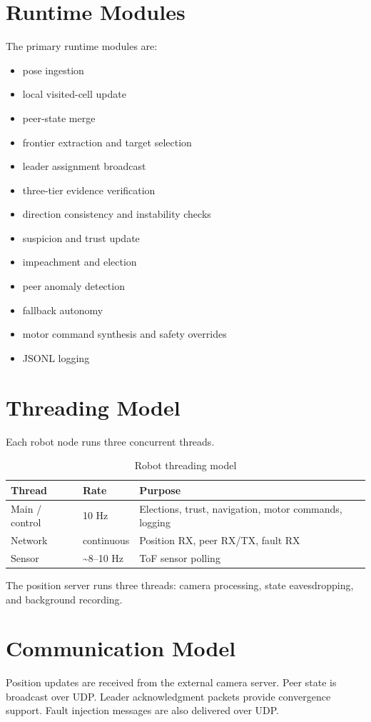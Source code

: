 \documentclass[a4paper,oneside,titlepage,11pt]{report}
\begin{document}
\section{Runtime Modules}
The primary runtime modules are:
\begin{itemize}
    \item pose ingestion
    \item local visited-cell update
    \item peer-state merge
    \item frontier extraction and target selection
    \item leader assignment broadcast
    \item three-tier evidence verification
    \item direction consistency and instability checks
    \item suspicion and trust update
    \item impeachment and election
    \item peer anomaly detection
    \item fallback autonomy
    \item motor command synthesis and safety overrides
    \item JSONL logging
\end{itemize}

\section{Threading Model}
Each robot node runs three concurrent threads.

\begin{table}[H]
\centering
\caption{Robot threading model}
\label{tab:robot_threads}
\begin{tabular}{lll}
\toprule
\textbf{Thread} & \textbf{Rate} & \textbf{Purpose} \\
\midrule
Main / control & 10 Hz & Elections, trust, navigation, motor commands, logging \\
Network & continuous & Position RX, peer RX/TX, fault RX \\
Sensor & \textasciitilde 8--10 Hz & ToF sensor polling \\
\bottomrule
\end{tabular}
\end{table}

The position server runs three threads: camera processing, state eavesdropping, and background recording.

\section{Communication Model}
Position updates are received from the external camera server. Peer state is broadcast over UDP. Leader acknowledgment packets provide convergence support. Fault injection messages are also delivered over UDP.
\end{document}
